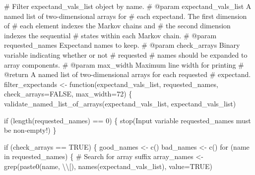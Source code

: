 \documentclass[
  letterpaper,
  DIV=11,
  numbers=noendperiod]{scrartcl}
\newenvironment{Shaded}{\begin{snugshade}}{\end{snugshade}}
\newcommand{\CharTok}[1]{\textcolor[rgb]{0.13,0.47,0.30}{#1}}
\newcommand{\CommentTok}[1]{\textcolor[rgb]{0.37,0.37,0.37}{#1}}
\newcommand{\ControlFlowTok}[1]{\textcolor[rgb]{0.00,0.23,0.31}{#1}}
\newcommand{\DecValTok}[1]{\textcolor[rgb]{0.68,0.00,0.00}{#1}}
\newcommand{\KeywordTok}[1]{\textcolor[rgb]{0.00,0.23,0.31}{#1}}
\newcommand{\NormalTok}[1]{\textcolor[rgb]{0.00,0.23,0.31}{#1}}
\newcommand{\OperatorTok}[1]{\textcolor[rgb]{0.37,0.37,0.37}{#1}}
\newcommand{\StringTok}[1]{\textcolor[rgb]{0.13,0.47,0.30}{#1}}
\begin{document}
\begin{Shaded}
\begin{Highlighting}[]
\CommentTok{\# Filter \textasciigrave{}expectand\_vals\_list\textasciigrave{} object by name.}
\CommentTok{\# @param expectand\_vals\_list A named list of two{-}dimensional arrays for}
\CommentTok{\#                            each expectand.  The first dimension of}
\CommentTok{\#                            each element indexes the Markov chains and}
\CommentTok{\#                            the second dimension indexes the sequential}
\CommentTok{\#                            states within each Markov chain.}
\CommentTok{\# @param requested\_names Expectand names to keep.}
\CommentTok{\# @param check\_arrays Binary variable indicating whether or not}
\CommentTok{\#                     requested}
\CommentTok{\#                     names should be expanded to array components.}
\CommentTok{\# @param max\_width Maximum line width for printing}
\CommentTok{\# @return A named list of two{-}dimensional arrays for each requested}
\CommentTok{\#         expectand.}
\NormalTok{filter\_expectands }\OperatorTok{\textless{}{-}}\NormalTok{ function(expectand\_vals\_list, requested\_names,}
\NormalTok{                              check\_arrays}\OperatorTok{=}\NormalTok{FALSE, max\_width}\OperatorTok{=}\DecValTok{72}\NormalTok{) \{}
\NormalTok{  validate\_named\_list\_of\_arrays(expectand\_vals\_list,}
                                \StringTok{\textquotesingle{}expectand\_vals\_list\textquotesingle{}}\NormalTok{)}
  
  \ControlFlowTok{if}\NormalTok{ (length(requested\_names) }\OperatorTok{==} \DecValTok{0}\NormalTok{) \{}
\NormalTok{    stop(}\StringTok{\textquotesingle{}Input variable requested\_names must be non{-}empty!\textquotesingle{}}\NormalTok{)}
\NormalTok{  \}}
  
  \ControlFlowTok{if}\NormalTok{ (check\_arrays }\OperatorTok{==}\NormalTok{ TRUE) \{}
\NormalTok{    good\_names }\OperatorTok{\textless{}{-}}\NormalTok{ c()}
\NormalTok{    bad\_names }\OperatorTok{\textless{}{-}}\NormalTok{ c()}
    \ControlFlowTok{for}\NormalTok{ (name }\KeywordTok{in}\NormalTok{ requested\_names) \{}
      \CommentTok{\# Search for array suffix}
\NormalTok{      array\_names }\OperatorTok{\textless{}{-}}\NormalTok{ grep(paste0(name, }\StringTok{\textquotesingle{}}\CharTok{\textbackslash{}\textbackslash{}}\StringTok{[\textquotesingle{}}\NormalTok{),}
\NormalTok{                          names(expectand\_vals\_list),}
\NormalTok{                          value}\OperatorTok{=}\NormalTok{TRUE)}
      

\end{Highlighting}
\end{Shaded}
\end{document}
